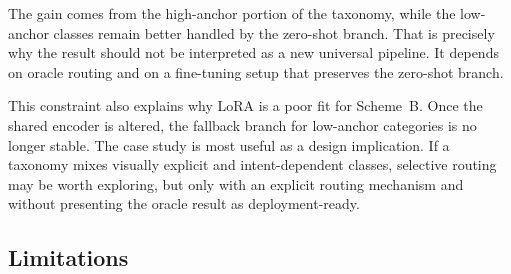 \documentclass{ieeeaccess}
\begin{document}
The gain comes from the high-anchor portion of the taxonomy, while the
low-anchor classes remain better handled by the zero-shot branch.
That is precisely why the result should not be interpreted as a new
universal pipeline.
It depends on oracle routing and on a fine-tuning setup that preserves
the zero-shot branch.

This constraint also explains why LoRA is a poor fit for Scheme~B.
Once the shared encoder is altered, the fallback branch for low-anchor
categories is no longer stable.
The case study is most useful as a design implication.
If a taxonomy mixes visually explicit and intent-dependent classes,
selective routing may be worth exploring, but only with an explicit
routing mechanism and without presenting the oracle result as
deployment-ready.

\subsection{Limitations}
\label{sec:limitations}
\end{document}

